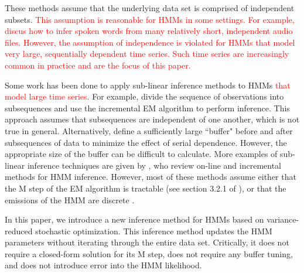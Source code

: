 %
These methods assume that the underlying data set is comprised of independent subsets. \textcolor{red}{This assumption is reasonable for HMMs in some settings. For example, \citet{Gales:2008} discus how to infer spoken words from many relatively short, independent audio files. However, the assumption of independence is violated for HMMs that model very large, sequentially dependent time series. Such time series are increasingly common in practice and are the focus of this paper.} 

Some work has been done to apply sub-linear inference methods to HMMs \textcolor{red}{that model large time series}.
For example, \citet{Gotoh:1998} divide the sequence of observations into subsequences
and use the incremental EM algorithm to perform inference. This approach assumes that subsequences are independent of one another, which is not true in general. Alternatively, \citet{Ye:2017} define a sufficiently large ``buffer" before and after subsequences of data to minimize the effect of serial dependence. %
However, the appropriate size of the buffer can be difficult to calculate. %
More examples of sub-linear inference techniques are given by \citet{Khreich:2012}, who review on-line and incremental methods for HMM inference. However, most of these methods assume either that the M step of the EM algorithm is tractable (see section 3.2.1 of \citet{Khreich:2012}), or that the emissions of the HMM are discrete \citep{Baldi:1993}. 

In this paper, we introduce a new inference method for HMMs based on variance-reduced stochastic optimization. This inference method updates the HMM parameters without iterating through the entire data set. Critically, it does not require a closed-form solution for its M step, does not require any buffer tuning, and does not introduce error into the HMM likelihood.

